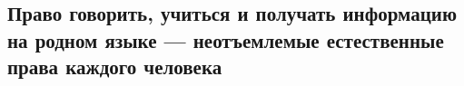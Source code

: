  
 
 
 
 

\subsection{Право говорить, учиться и получать информацию на родном языке — неотъемлемые естественные права каждого человека}
\label{sec:07_07_2020.fb.opzzh.1.jazyk}

